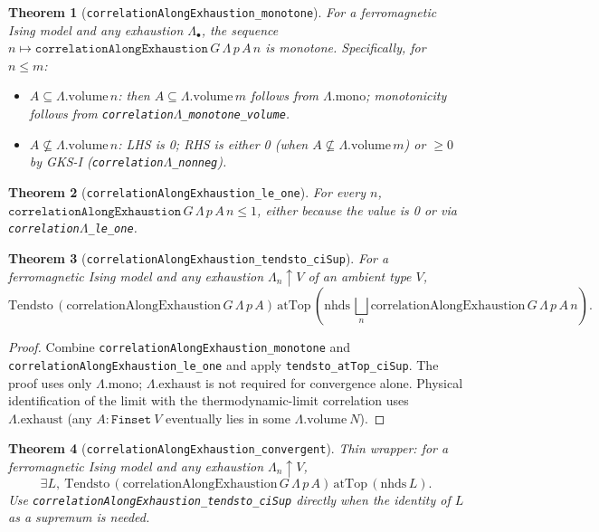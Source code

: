 \documentclass[a4paper,11pt]{article}
\newtheorem{theorem}{Theorem}
\newcommand{\LeanLambda}{\texorpdfstring{\ensuremath{\Lambda}}{Lambda}}
\begin{document}
\begin{theorem}[\texttt{correlationAlongExhaustion\_monotone}]
For a ferromagnetic Ising model and any exhaustion $\Lambda_\bullet$,
the sequence $n \mapsto \texttt{correlationAlongExhaustion}\,G\,\Lambda\,p\,A\,n$
is monotone.  Specifically, for $n \le m$:
\begin{itemize}
  \item $A \subseteq \Lambda.\text{volume}\,n$: then
    $A \subseteq \Lambda.\text{volume}\,m$ follows from $\Lambda.\text{mono}$;
    monotonicity follows from \texttt{correlation\LeanLambda\_monotone\_volume}.
  \item $A \not\subseteq \Lambda.\text{volume}\,n$: LHS is 0;
    RHS is either 0 (when $A \not\subseteq \Lambda.\text{volume}\,m$)
    or $\ge 0$ by GKS-I (\texttt{correlation\LeanLambda\_nonneg}).
\end{itemize}
\end{theorem}

\begin{theorem}[\texttt{correlationAlongExhaustion\_le\_one}]
For every $n$, $\texttt{correlationAlongExhaustion}\,G\,\Lambda\,p\,A\,n \le 1$,
either because the value is 0 or via \texttt{correlation\LeanLambda\_le\_one}.
\end{theorem}

\begin{theorem}[\texttt{correlationAlongExhaustion\_tendsto\_ciSup}]
For a ferromagnetic Ising model and any exhaustion $\Lambda_n \uparrow V$
of an ambient type $V$,
\[
\text{Tendsto}\,(\text{correlationAlongExhaustion}\,G\,\Lambda\,p\,A)\,\text{atTop}\,
  \left(\text{nhds}\,\bigsqcup_n \text{correlationAlongExhaustion}\,G\,\Lambda\,p\,A\,n\right).
\]
\end{theorem}

\begin{proof}
Combine \texttt{correlationAlongExhaustion\_monotone} and
\texttt{correlationAlongExhaustion\_le\_one} and apply
\texttt{tendsto\_atTop\_ciSup}.  The proof uses only $\Lambda.\text{mono}$;
$\Lambda.\text{exhaust}$ is not required for convergence alone.  Physical
identification of the limit with the thermodynamic-limit correlation
uses $\Lambda.\text{exhaust}$ (any $A : \texttt{Finset}~V$ eventually
lies in some $\Lambda.\text{volume}~N$).
\end{proof}

\begin{theorem}[\texttt{correlationAlongExhaustion\_convergent}]
Thin wrapper: for a ferromagnetic Ising model and any exhaustion
$\Lambda_n \uparrow V$,
\[
\exists L,\ \text{Tendsto}\,(\text{correlationAlongExhaustion}\,G\,\Lambda\,p\,A)\,\text{atTop}\,(\text{nhds}\,L).
\]
Use \texttt{correlationAlongExhaustion\_tendsto\_ciSup} directly when the
identity of $L$ as a supremum is needed.
\end{theorem}
\end{document}
